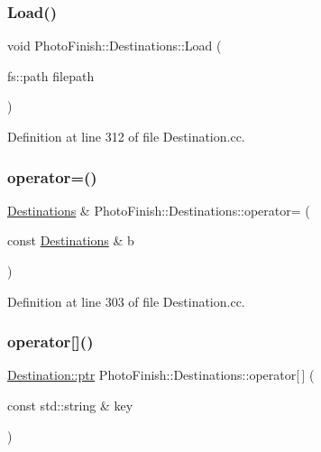 \subsubsection{\texorpdfstring{Load()}{Load()}}
{\footnotesize\ttfamily void Photo\+Finish\+::\+Destinations\+::\+Load (\begin{DoxyParamCaption}\item[{fs\+::path}]{filepath }\end{DoxyParamCaption})}



Definition at line 312 of file Destination.\+cc.

\mbox{\label{class_photo_finish_1_1_destinations_afc45abc75ba8e433c74b2be3e3d969e1}} 
\subsubsection{\texorpdfstring{operator=()}{operator=()}}
{\footnotesize\ttfamily \hyperlink{class_photo_finish_1_1_destinations}{Destinations} \& Photo\+Finish\+::\+Destinations\+::operator= (\begin{DoxyParamCaption}\item[{const \hyperlink{class_photo_finish_1_1_destinations}{Destinations} \&}]{b }\end{DoxyParamCaption})}



Definition at line 303 of file Destination.\+cc.

\mbox{\label{class_photo_finish_1_1_destinations_a93a9459dc194cc6511acc9c0ef948248}} 
\subsubsection{\texorpdfstring{operator[]()}{operator[]()}}
{\footnotesize\ttfamily \hyperlink{class_photo_finish_1_1_destination_a0d282a905cd81c3f0e6d7233c9bc7774}{Destination\+::ptr} Photo\+Finish\+::\+Destinations\+::operator\mbox{[}$\,$\mbox{]} (\begin{DoxyParamCaption}\item[{const std\+::string \&}]{key }\end{DoxyParamCaption})\hspace{0.3cm}{\ttfamily [inline]}}



